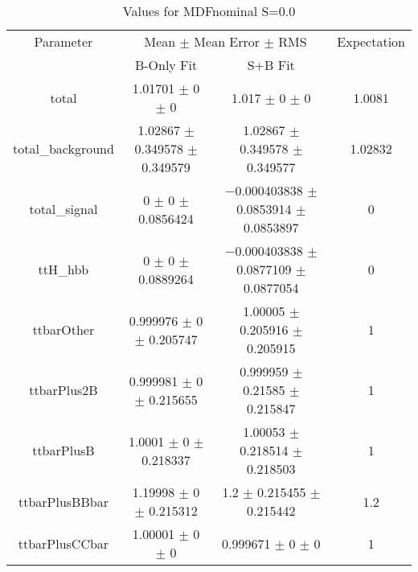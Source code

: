 \begin{table}
\centering
\caption{Values for MDFnominal S=0.0}
\begin{tabular}{cccc}
\toprule
Parameter & \multicolumn{2}{c}{Mean $\pm$ Mean Error $\pm$ RMS} & Expectation\\
 & B-Only Fit & S+B Fit & \\
\midrule
total & \num{1.01701} $\pm$ \num{0} $\pm$ \num{0} & \num{1.017} $\pm$ \num{0} $\pm$ \num{0} & \num{1.0081}\\
total\_background & \num{1.02867} $\pm$ \num{0.349578} $\pm$ \num{0.349579} & \num{1.02867} $\pm$ \num{0.349578} $\pm$ \num{0.349577} & \num{1.02832}\\
total\_signal & \num{0} $\pm$ \num{0} $\pm$ \num{0.0856424} & \num{-0.000403838} $\pm$ \num{0.0853914} $\pm$ \num{0.0853897} & \num{0}\\
ttH\_hbb & \num{0} $\pm$ \num{0} $\pm$ \num{0.0889264} & \num{-0.000403838} $\pm$ \num{0.0877109} $\pm$ \num{0.0877054} & \num{0}\\
ttbarOther & \num{0.999976} $\pm$ \num{0} $\pm$ \num{0.205747} & \num{1.00005} $\pm$ \num{0.205916} $\pm$ \num{0.205915} & \num{1}\\
ttbarPlus2B & \num{0.999981} $\pm$ \num{0} $\pm$ \num{0.215655} & \num{0.999959} $\pm$ \num{0.21585} $\pm$ \num{0.215847} & \num{1}\\
ttbarPlusB & \num{1.0001} $\pm$ \num{0} $\pm$ \num{0.218337} & \num{1.00053} $\pm$ \num{0.218514} $\pm$ \num{0.218503} & \num{1}\\
ttbarPlusBBbar & \num{1.19998} $\pm$ \num{0} $\pm$ \num{0.215312} & \num{1.2} $\pm$ \num{0.215455} $\pm$ \num{0.215442} & \num{1.2}\\
ttbarPlusCCbar & \num{1.00001} $\pm$ \num{0} $\pm$ \num{0} & \num{0.999671} $\pm$ \num{0} $\pm$ \num{0} & \num{1}\\
\bottomrule
\end{tabular}
\end{table}